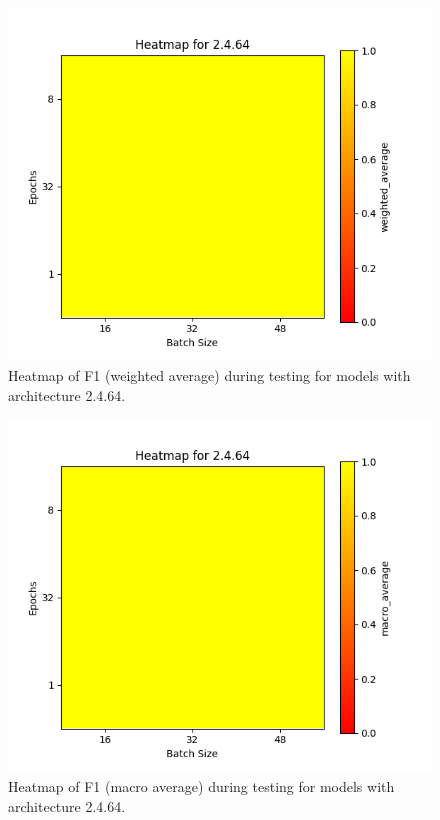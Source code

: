 \documentclass[12pt]{article}
\begin{document}
\begin{figure}[H]
\includegraphics[width=\textwidth]{heatmap_f1_weighted_average_2.4.64}
\centering
\caption{Heatmap of F1 (weighted average) during testing for models with architecture 2.4.64.}
\label{fig:time-metrics}
\end{figure}

\begin{figure}[H]
\includegraphics[width=\textwidth]{heatmap_f1_macro_average_2.4.64}
\centering
\caption{Heatmap of F1 (macro average) during testing for models with architecture 2.4.64.}
\label{fig:time-metrics}
\end{figure}
\end{document}
